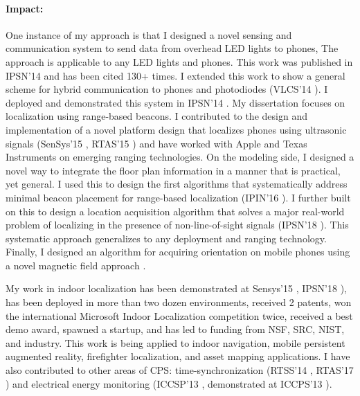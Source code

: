 \documentclass[10pt]{article}
\begin{document}
\paragraph{Impact: }
One instance of my approach is that I designed a novel sensing and communication system to send data from overhead LED lights to phones, 
The approach is applicable to any LED lights and phones. This work was published in IPSN'14 \cite{rajagopal2014visual} and has been cited 130+ times. I extended this work to show a general scheme for hybrid communication to phones and photodiodes (VLCS'14 \cite{rajagopal2014hybrid}). I deployed and demonstrated this system in IPSN'14 \cite{rajagopal2014demonstration}. My dissertation focuses on localization using range-based beacons. I contributed to the design and implementation of a novel platform design that localizes phones using ultrasonic signals (SenSys'15 \cite{lazik2015alps},
RTAS'15 \cite{rtas-alps-platform}) and have worked with Apple and Texas Instruments on emerging ranging technologies. %
On the modeling side, I designed a novel way to integrate the floor plan information in a manner that is practical, yet general. %
I used this to design the first algorithms that systematically address minimal beacon placement for range-based localization (IPIN'16 \cite{rajagopal2016beacon}). I further built on this to design a location acquisition algorithm that solves a major real-world problem of localizing in the presence of non-line-of-sight signals (IPSN'18 \cite{rajagopal2018enhancing}). This systematic approach generalizes to any deployment and ranging technology. %
Finally, I designed an algorithm for acquiring orientation on mobile phones using a novel magnetic field approach \cite{mobileAR}.  

My work in indoor localization has been demonstrated at
Sensys'15 \cite{lazik2015alpsdemo}, IPSN'18 \cite{rajagopal2018welcome}), has been deployed in more than two dozen environments, received 2 patents, won the international
Microsoft Indoor Localization competition twice, received a best demo
award, spawned a startup, and has led to funding from NSF, SRC, NIST, and
industry. This work is being applied to indoor navigation, mobile
persistent augmented reality, firefighter localization, and asset
mapping applications.  I have also contributed to other areas of CPS:
time-synchronization (RTSS'14 \cite{buevich2013hardware}, RTAS'17 \cite{dongare2017pulsar}) and electrical energy
monitoring (ICCSP'13 \cite{rajagopal2013magnetic}, demonstrated at ICCPS'13 \cite{rajagopal2013demo}).
\end{document}
